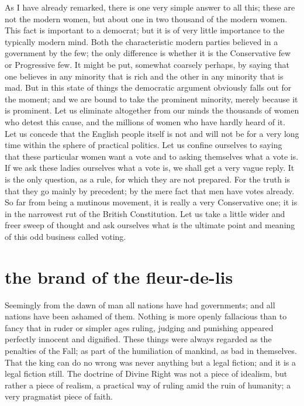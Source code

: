 \documentclass[final,10pt,letterpaper,twocolumn,openany]{book}
\begin{document}
As I have already remarked, there is one very simple answer to all this;
these are not the modern women, but about one in two thousand of the
modern women. This fact is important to a democrat; but it is of very little
importance to the typically modern mind. Both the characteristic modern
parties believed in a government by the few; the only difference is whether
it is the Conservative few or Progressive few. It might be put, somewhat
coarsely perhaps, by saying that one believes in any minority that is rich
and the other in any minority that is mad. But in this state of things the
democratic argument obviously falls out for the moment; and we are
bound to take the prominent minority, merely because it is prominent. Let
us eliminate altogether from our minds the thousands of women who
detest this cause, and the millions of women who have hardly heard of it.
Let us concede that the English people itself is not and will not be for a
very long time within the sphere of practical politics. Let us confine
ourselves to saying that these particular women want a vote and to asking
themselves what a vote is. If we ask these ladies ourselves what a vote is,
we shall get a very vague reply. It is the only question, as a rule, for which
they are not prepared. For the truth is that they go mainly by precedent; by
the mere fact that men have votes already. So far from being a mutinous
movement, it is really a very Conservative one; it is in the narrowest rut of
the British Constitution. Let us take a little wider and freer sweep of
thought and ask ourselves what is the ultimate point and meaning of this
odd business called voting.

\section{the brand of the fleur-de-lis}

   Seemingly from the dawn of man all nations have had governments;
and all nations have been ashamed of them. Nothing is more openly
fallacious than to fancy that in ruder or simpler ages ruling, judging and
punishing appeared perfectly innocent and dignified. These things were
always regarded as the penalties of the Fall; as part of the humiliation of
mankind, as bad in themselves. That the king can do no wrong was never
anything but a legal fiction; and it is a legal fiction still. The doctrine of
Divine Right was not a piece of idealism, but rather a piece of realism, a
practical way of ruling amid the ruin of humanity; a very pragmatist piece
of faith. 
\end{document}
